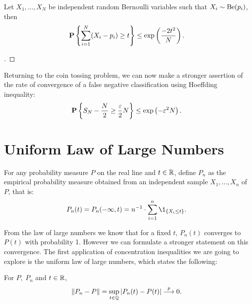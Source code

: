 \begin{corollary}\label{hoeffding:bernoulli}
  Let $X_1,\ldots, X_N$ be independent random Bernoulli variables such that $X_i \sim \Be(p_i)$, then
  \[ \P\left\{ \sum_{i = 1}^N (X_i - p_i) \geq t\right\} \leq \exp\left( \frac{-2t^2}{N}\right). \] 
\end{corollary}

\begin{proof}[]

\end{proof}

Returning to the coin tossing problem, we can now make a stronger assertion of the rate of convergence of a false negative classification using Hoeffding inequality:
\[\P \left\{S_N- \frac{N}{2} \geq \frac{\varepsilon}{2} N \right\} \leq \exp\left( - \varepsilon^2 N \right). \] 




\section{Uniform Law of Large Numbers}
For any probability measure $P$ on the real line and $t \in \R$, define $P_n$ as the empirical probability measure obtained from an independent sample $X_1, \ldots, X_n$ of $P$, that is:
\[ P_n(t) = P_n(-\infty, t) = n^{-1} \cdot \sum_{i = 1}^n \1_{\{ X_i \leq t\}}.\]

From the law of large numbers we know that for a fixed $t$, $P_n(t)$ converges to $P(t)$ with probability 1. However we can formulate a stronger statement on this convergence. The first application of concentration inequalities we are going to explore is the uniform law of large numbers, which states the following:

\begin{theorem}\label{glivenko-cantelli}
  For $P,\; P_n$ and $t \in \R$,
  \[ \|P_n - P\| = \sup_{t\in \Q} \left|P_n(t) - P(t)\right| \overset{p}{\longrightarrow} 0.\]  
\end{theorem} 

